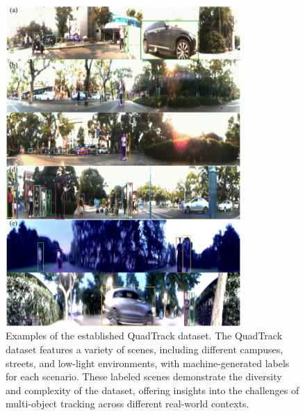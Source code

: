 \begin{figure}[!t]
  \centering
  \includegraphics[width=0.80\textwidth]{imgs/vis_img_v2.pdf}
  \caption{Examples of the established QuadTrack dataset. The QuadTrack dataset features a variety of scenes, including different campuses, streets, and low-light environments, with machine-generated labels for each scenario. These labeled scenes demonstrate the diversity and complexity of the dataset, offering insights into the challenges of multi-object tracking across different real-world contexts.}
  \label{fig:vis_anno}
\end{figure}

